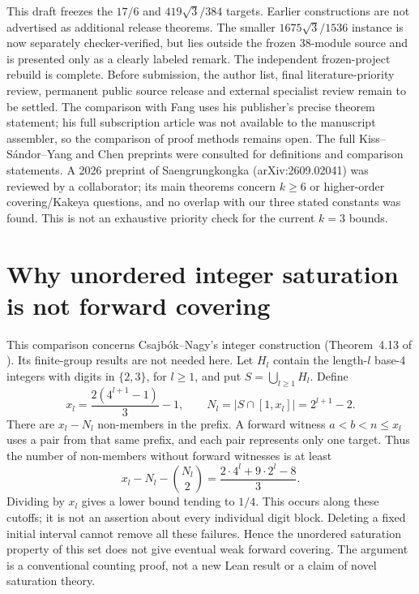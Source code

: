 \documentclass[11pt]{article}
\begin{document}
This draft freezes the $17/6$ and $419\sqrt3/384$ targets. Earlier constructions are not advertised as additional release theorems. The smaller $1675\sqrt3/1536$ instance is now separately checker-verified, but lies outside the frozen 38-module source and is presented only as a clearly labeled remark. The independent frozen-project rebuild is complete. Before submission, the author list, final literature-priority review, permanent public source release and external specialist review remain to be settled. The comparison with Fang uses his publisher's precise theorem statement; his full subscription article was not available to the manuscript assembler, so the comparison of proof methods remains open. The full Kiss--S\'andor--Yang and Chen preprints were consulted for definitions and comparison statements. A 2026 preprint of Saengrungkongka (arXiv:2609.02041) was reviewed by a collaborator; its main theorems concern $k\ge6$ or higher-order covering/Kakeya questions, and no overlap with our three stated constants was found. This is not an exhaustive priority check for the current $k=3$ bounds.


\section{Why unordered integer saturation is not forward covering}
This comparison concerns Csajb\'ok--Nagy's integer construction
(Theorem~4.13 of ). Its finite-group results are not
needed here. Let $H_l$ contain the length-$l$ base-4 integers with digits in
$\{2,3\}$, for $l\ge1$, and put $S=\bigcup_{l\ge1}H_l$. Define
\[
x_l=\frac{2(4^{l+1}-1)}3-1,\qquad
N_l=|S\cap[1,x_l]|=2^{l+1}-2.
\]
There are $x_l-N_l$ non-members in the prefix. A forward witness
$a<b<n\le x_l$ uses a pair from that same prefix, and each pair represents
only one target. Thus the number of non-members without forward witnesses is
at least
\[
x_l-N_l-\binom{N_l}{2}
=\frac{2\cdot4^l+9\cdot2^l-8}{3}.
\]
Dividing by $x_l$ gives a lower bound tending to $1/4$. This occurs along
these cutoffs; it is not an assertion about every individual digit block.
Deleting a fixed initial interval cannot remove all these failures. Hence the
unordered saturation property of this set does not give eventual weak forward
covering. The argument is a conventional counting proof, not a new Lean result
or a claim of novel saturation theory.
\end{document}
